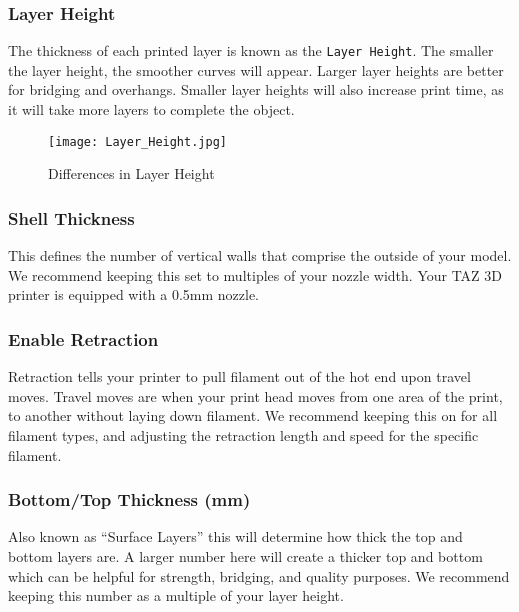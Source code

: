 \subsubsection{Layer Height}
The thickness of each printed layer is known as the \texttt{Layer Height}. The smaller the layer height, the smoother curves will appear. Larger layer heights are better for bridging and overhangs. Smaller layer heights will also increase print time, as it will take more layers to complete the object.
\begin{figure}[H]
\centering
\texttt{[image: Layer\_Height.jpg]}
\caption{Differences in Layer Height}
\label{fig:Differences in Layer Height}
\end{figure}


\subsubsection{Shell Thickness}
This defines the number of vertical walls that comprise the outside of your model. We recommend keeping this set to multiples of your nozzle width. Your TAZ 3D printer is equipped with a 0.5mm nozzle. %

\subsubsection{Enable Retraction}
Retraction tells your printer to pull filament out of the hot end upon travel moves. Travel moves are when your print head moves from one area of the print, to another without laying down filament. We recommend keeping this on for all filament types, and adjusting the retraction length and speed for the specific filament.

\subsubsection{Bottom/Top Thickness (mm)}
Also known as ``Surface Layers'' this will determine how thick the top and bottom layers are. A larger number here will create a thicker top and bottom which can be helpful for strength, bridging, and quality purposes. We recommend keeping this number as a multiple of your layer height.

